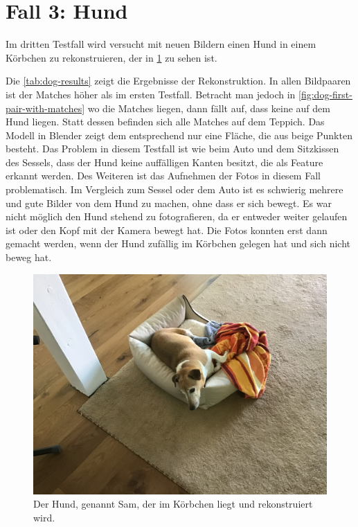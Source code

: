 \section{Fall 3: Hund}
\label{sec:testcase-dog}
Im dritten Testfall wird versucht mit neuen Bildern einen Hund in einem Körbchen zu rekonstruieren, der in \cref{fig:dog-image} zu sehen ist.

Die \cref{tab:dog-results} zeigt die Ergebnisse der Rekonstruktion.
In allen Bildpaaren ist der Matches höher als im ersten Testfall.
Betracht man jedoch in \cref{fig:dog-first-pair-with-matches} wo die Matches liegen, dann fällt auf, dass keine auf dem Hund liegen.
Statt dessen befinden sich alle Matches auf dem Teppich.
Das Modell in Blender zeigt dem entsprechend nur eine Fläche, die aus beige Punkten besteht.
Das Problem in diesem Testfall ist wie beim Auto und dem Sitzkissen des Sessels, dass der Hund keine auffälligen Kanten besitzt, die als Feature erkannt werden.
Des Weiteren ist das Aufnehmen der Fotos in diesem Fall problematisch. 
Im Vergleich zum Sessel oder dem Auto ist es schwierig mehrere und gute Bilder von dem Hund zu machen, ohne dass er sich bewegt. 
Es war nicht möglich den Hund stehend zu fotografieren, da er entweder weiter gelaufen ist oder den Kopf mit der Kamera bewegt hat.
Die Fotos konnten erst dann gemacht werden, wenn der Hund zufällig im Körbchen gelegen hat und sich nicht beweg hat.

\begin{figure}
    \includegraphics[width=\textwidth]{src/img/dog.jpg}
    \caption{Der Hund, genannt Sam, der im Körbchen liegt und rekonstruiert wird.}
    \label{fig:dog-image}
\end{figure}

